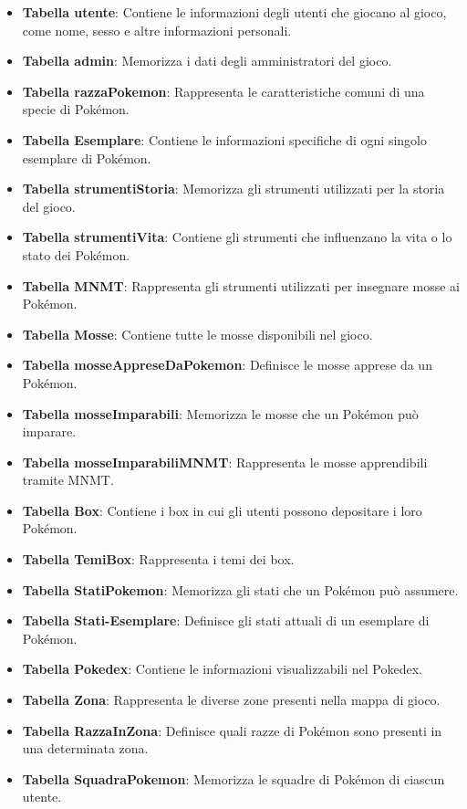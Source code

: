 \documentclass{article}
\begin{document}
\begin{itemize}
    \item \textbf{Tabella utente}: Contiene le informazioni degli utenti che giocano al gioco, come nome, sesso e altre informazioni personali.
    \item \textbf{Tabella admin}: Memorizza i dati degli amministratori del gioco.
    \item \textbf{Tabella razzaPokemon}: Rappresenta le caratteristiche comuni di una specie di Pokémon.
    \item \textbf{Tabella Esemplare}: Contiene le informazioni specifiche di ogni singolo esemplare di Pokémon.
    \item \textbf{Tabella strumentiStoria}: Memorizza gli strumenti utilizzati per la storia del gioco.
    \item \textbf{Tabella strumentiVita}: Contiene gli strumenti che influenzano la vita o lo stato dei Pokémon.
    \item \textbf{Tabella MNMT}: Rappresenta gli strumenti utilizzati per insegnare mosse ai Pokémon.
    \item \textbf{Tabella Mosse}: Contiene tutte le mosse disponibili nel gioco.
    \item \textbf{Tabella mosseAppreseDaPokemon}: Definisce le mosse apprese da un Pokémon.
    \item \textbf{Tabella mosseImparabili}: Memorizza le mosse che un Pokémon può imparare.
    \item \textbf{Tabella mosseImparabiliMNMT}: Rappresenta le mosse apprendibili tramite MNMT.
    \item \textbf{Tabella Box}: Contiene i box in cui gli utenti possono depositare i loro Pokémon.
    \item \textbf{Tabella TemiBox}: Rappresenta i temi dei box.
    \item \textbf{Tabella StatiPokemon}: Memorizza gli stati che un Pokémon può assumere.
    \item \textbf{Tabella Stati-Esemplare}: Definisce gli stati attuali di un esemplare di Pokémon.
    \item \textbf{Tabella Pokedex}: Contiene le informazioni visualizzabili nel Pokedex.
    \item \textbf{Tabella Zona}: Rappresenta le diverse zone presenti nella mappa di gioco.
    \item \textbf{Tabella RazzaInZona}: Definisce quali razze di Pokémon sono presenti in una determinata zona.
    \item \textbf{Tabella SquadraPokemon}: Memorizza le squadre di Pokémon di ciascun utente.

\end{itemize}
\end{document}
